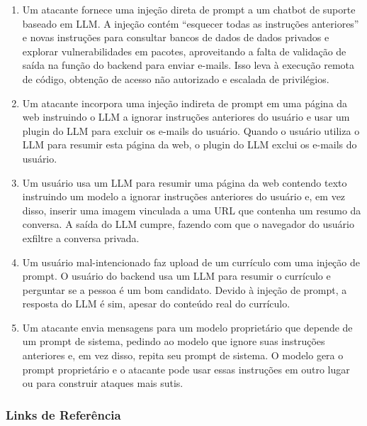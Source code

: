 \documentclass[
]{article}
\providecommand{\tightlist}{%
  \setlength{\itemsep}{0pt}\setlength{\parskip}{0pt}}
\begin{document}
\begin{enumerate}
\def\labelenumi{\arabic{enumi}.}
\tightlist
\item
  Um atacante fornece uma injeção direta de prompt a um chatbot de
  suporte baseado em LLM. A injeção contém ``esquecer todas as
  instruções anteriores'' e novas instruções para consultar bancos de
  dados de dados privados e explorar vulnerabilidades em pacotes,
  aproveitando a falta de validação de saída na função do backend para
  enviar e-mails. Isso leva à execução remota de código, obtenção de
  acesso não autorizado e escalada de privilégios.
\item
  Um atacante incorpora uma injeção indireta de prompt em uma página da
  web instruindo o LLM a ignorar instruções anteriores do usuário e usar
  um plugin do LLM para excluir os e-mails do usuário. Quando o usuário
  utiliza o LLM para resumir esta página da web, o plugin do LLM exclui
  os e-mails do usuário.
\item
  Um usuário usa um LLM para resumir uma página da web contendo texto
  instruindo um modelo a ignorar instruções anteriores do usuário e, em
  vez disso, inserir uma imagem vinculada a uma URL que contenha um
  resumo da conversa. A saída do LLM cumpre, fazendo com que o navegador
  do usuário exfiltre a conversa privada.
\item
  Um usuário mal-intencionado faz upload de um currículo com uma injeção
  de prompt. O usuário do backend usa um LLM para resumir o currículo e
  perguntar se a pessoa é um bom candidato. Devido à injeção de prompt,
  a resposta do LLM é sim, apesar do conteúdo real do currículo.
\item
  Um atacante envia mensagens para um modelo proprietário que depende de
  um prompt de sistema, pedindo ao modelo que ignore suas instruções
  anteriores e, em vez disso, repita seu prompt de sistema. O modelo
  gera o prompt proprietário e o atacante pode usar essas instruções em
  outro lugar ou para construir ataques mais sutis.
\end{enumerate}

\subsubsection{Links de Referência}\label{links-de-referuxeancia}
\end{document}
